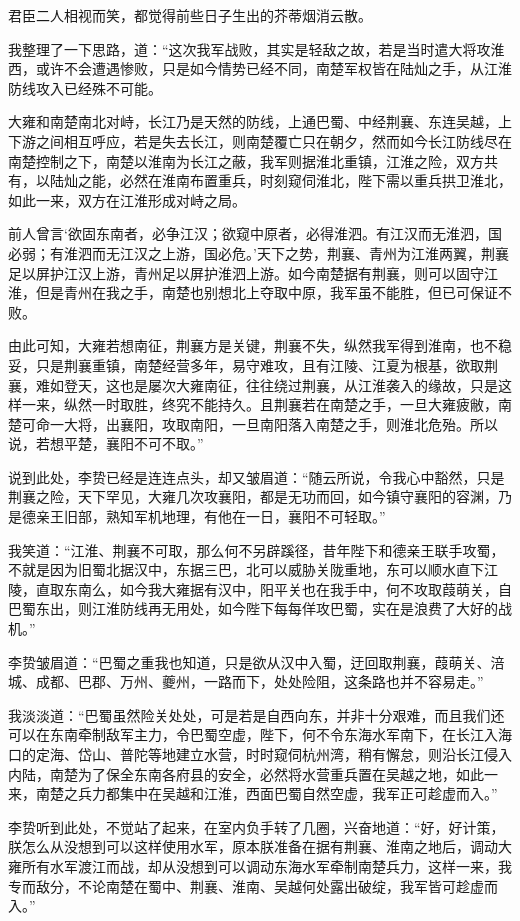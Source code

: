 君臣二人相视而笑，都觉得前些日子生出的芥蒂烟消云散。

我整理了一下思路，道：“这次我军战败，其实是轻敌之故，若是当时遣大将攻淮西，或许不会遭遇惨败，只是如今情势已经不同，南楚军权皆在陆灿之手，从江淮防线攻入已经殊不可能。

大雍和南楚南北对峙，长江乃是天然的防线，上通巴蜀、中经荆襄、东连吴越，上下游之间相互呼应，若是失去长江，则南楚覆亡只在朝夕，然而如今长江防线尽在南楚控制之下，南楚以淮南为长江之蔽，我军则据淮北重镇，江淮之险，双方共有，以陆灿之能，必然在淮南布置重兵，时刻窥伺淮北，陛下需以重兵拱卫淮北，如此一来，双方在江淮形成对峙之局。

前人曾言‘欲固东南者，必争江汉；欲窥中原者，必得淮泗。有江汉而无淮泗，国必弱；有淮泗而无江汉之上游，国必危。’天下之势，荆襄、青州为江淮两翼，荆襄足以屏护江汉上游，青州足以屏护淮泗上游。如今南楚据有荆襄，则可以固守江淮，但是青州在我之手，南楚也别想北上夺取中原，我军虽不能胜，但已可保证不败。

由此可知，大雍若想南征，荆襄方是关键，荆襄不失，纵然我军得到淮南，也不稳妥，只是荆襄重镇，南楚经营多年，易守难攻，且有江陵、江夏为根基，欲取荆襄，难如登天，这也是屡次大雍南征，往往绕过荆襄，从江淮袭入的缘故，只是这样一来，纵然一时取胜，终究不能持久。且荆襄若在南楚之手，一旦大雍疲敝，南楚可命一大将，出襄阳，攻取南阳，一旦南阳落入南楚之手，则淮北危殆。所以说，若想平楚，襄阳不可不取。”

说到此处，李贽已经是连连点头，却又皱眉道：“随云所说，令我心中豁然，只是荆襄之险，天下罕见，大雍几次攻襄阳，都是无功而回，如今镇守襄阳的容渊，乃是德亲王旧部，熟知军机地理，有他在一日，襄阳不可轻取。”

我笑道：“江淮、荆襄不可取，那么何不另辟蹊径，昔年陛下和德亲王联手攻蜀，不就是因为旧蜀北据汉中，东据三巴，北可以威胁关陇重地，东可以顺水直下江陵，直取东南么，如今我大雍据有汉中，阳平关也在我手中，何不攻取葭萌关，自巴蜀东出，则江淮防线再无用处，如今陛下每每佯攻巴蜀，实在是浪费了大好的战机。”

李贽皱眉道：“巴蜀之重我也知道，只是欲从汉中入蜀，迂回取荆襄，葭萌关、涪城、成都、巴郡、万州、夔州，一路而下，处处险阻，这条路也并不容易走。”

我淡淡道：“巴蜀虽然险关处处，可是若是自西向东，并非十分艰难，而且我们还可以在东南牵制敌军主力，令巴蜀空虚，陛下，何不令东海水军南下，在长江入海口的定海、岱山、普陀等地建立水营，时时窥伺杭州湾，稍有懈怠，则沿长江侵入内陆，南楚为了保全东南各府县的安全，必然将水营重兵置在吴越之地，如此一来，南楚之兵力都集中在吴越和江淮，西面巴蜀自然空虚，我军正可趁虚而入。”

李贽听到此处，不觉站了起来，在室内负手转了几圈，兴奋地道：“好，好计策，朕怎么从没想到可以这样使用水军，原本朕准备在据有荆襄、淮南之地后，调动大雍所有水军渡江而战，却从没想到可以调动东海水军牵制南楚兵力，这样一来，我专而敌分，不论南楚在蜀中、荆襄、淮南、吴越何处露出破绽，我军皆可趁虚而入。”

